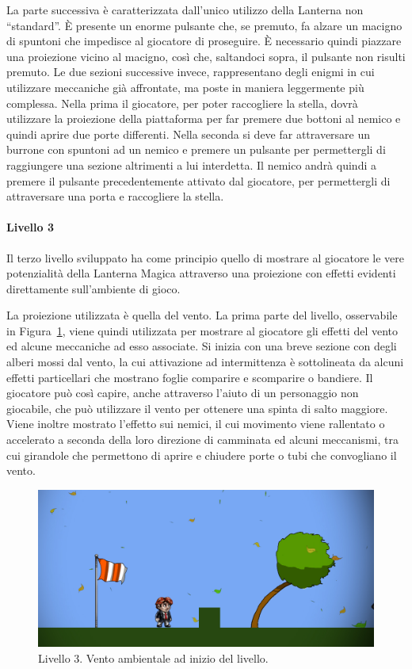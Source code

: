 La parte successiva è caratterizzata dall’unico utilizzo della Lanterna non “standard”. È presente un enorme pulsante che, se premuto, fa alzare un macigno di spuntoni che impedisce al giocatore di proseguire. È necessario quindi piazzare una proiezione vicino al macigno, così che, saltandoci sopra, il pulsante non risulti premuto.
Le due sezioni successive invece, rappresentano degli enigmi in cui utilizzare meccaniche già affrontate, ma poste in maniera leggermente più complessa. Nella prima il giocatore, per poter raccogliere la stella, dovrà utilizzare la proiezione della piattaforma per far premere due bottoni al nemico e quindi aprire due porte differenti. Nella seconda si deve far attraversare un burrone con spuntoni ad un nemico e premere un pulsante per permettergli di raggiungere una sezione altrimenti a lui interdetta. Il nemico andrà quindi a premere il pulsante precedentemente attivato dal giocatore, per permettergli di attraversare una porta e raccogliere la stella.

\paragraph{Livello 3}
\label{par:livello3}

Il terzo livello sviluppato ha come principio quello di mostrare al giocatore le vere potenzialità della Lanterna Magica attraverso una proiezione con effetti evidenti direttamente sull’ambiente di gioco.

La proiezione utilizzata è quella del vento. La prima parte del livello, osservabile in Figura~\ref{fig:livello3_vento_ambientale}, viene quindi utilizzata per mostrare al giocatore gli effetti del vento ed alcune meccaniche ad esso associate. Si inizia con una breve sezione con degli alberi mossi dal vento, la cui attivazione ad intermittenza è sottolineata da alcuni effetti particellari che mostrano foglie comparire e scomparire o bandiere. Il giocatore può così capire, anche attraverso l’aiuto di un personaggio non giocabile, che può utilizzare il vento per ottenere una spinta di salto maggiore. Viene inoltre mostrato l’effetto sui nemici, il cui movimento viene rallentato o accelerato a seconda della loro direzione di camminata ed alcuni meccanismi, tra cui girandole che permettono di aprire e chiudere porte o tubi che convogliano il vento.

\begin{figure}%
	\centering
	\includegraphics[width= 0.9\columnwidth]{images/gameDesign/50_vento.jpg}
	\caption{Livello 3. Vento ambientale ad inizio del livello.}
	\label{fig:livello3_vento_ambientale}
\end{figure}


